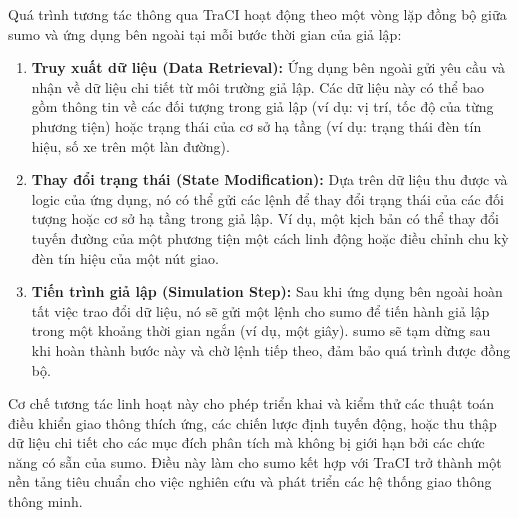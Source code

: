 Quá trình tương tác thông qua TraCI hoạt động theo một vòng lặp đồng bộ giữa \ac{sumo}
và ứng dụng bên ngoài tại mỗi bước thời gian của giả lập:
\begin{enumerate}
    \item \textbf{Truy xuất dữ liệu (Data Retrieval):} Ứng dụng bên ngoài gửi
        yêu cầu và nhận về dữ liệu chi tiết từ môi trường giả lập. Các dữ liệu này
        có thể bao gồm thông tin về các đối tượng trong giả lập (ví dụ: vị trí,
        tốc độ của từng phương tiện) hoặc trạng thái của cơ sở hạ tầng (ví dụ: trạng
        thái đèn tín hiệu, số xe trên một làn đường).

    \item \textbf{Thay đổi trạng thái (State Modification):} Dựa trên dữ liệu
        thu được và logic của ứng dụng, nó có thể gửi các lệnh để thay đổi trạng
        thái của các đối tượng hoặc cơ sở hạ tầng trong giả lập. Ví dụ, một kịch
        bản có thể thay đổi tuyến đường của một phương tiện một cách linh động hoặc
        điều chỉnh chu kỳ đèn tín hiệu của một nút giao.

    \item \textbf{Tiến trình giả lập (Simulation Step):} Sau khi ứng dụng bên
        ngoài hoàn tất việc trao đổi dữ liệu, nó sẽ gửi một lệnh cho \ac{sumo}
        để tiến hành giả lập trong một khoảng thời gian ngắn (ví dụ, một giây).
        \ac{sumo} sẽ tạm dừng sau khi hoàn thành bước này và chờ lệnh tiếp theo,
        đảm bảo quá trình được đồng bộ.
\end{enumerate}
Cơ chế tương tác linh hoạt này cho phép triển khai và kiểm thử các thuật toán điều
khiển giao thông thích ứng, các chiến lược định tuyến động, hoặc thu thập dữ liệu
chi tiết cho các mục đích phân tích mà không bị giới hạn bởi các chức năng có sẵn
của \ac{sumo}. Điều này làm cho \ac{sumo} kết hợp với TraCI trở thành một nền
tảng tiêu chuẩn cho việc nghiên cứu và phát triển các hệ thống giao thông thông
minh.


